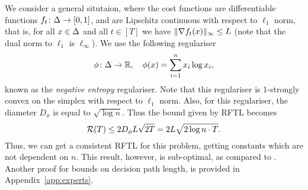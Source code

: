 We consider a general situtaion, where the cost functions are differentiable functions $f_t\colon \Delta \to [0,1]$, and are Lipschitz continuous with respect to $\ell_1$ norm, that is, for all $x\in\Delta$ and all $t\in[T]$ we have $\| \nabla f_t(x) \|_\infty \leq L$ (note that the dual norm to $\ell_1$ is  $\ell_\infty$). We use the following regulariser
\[
    \phi\colon \Delta\to\mathbb{R},\quad \phi(x) = \sum_{i=1}^n x_i\log x_i,
\]
known as the \emph{negative entropy} regulariser. Note that this regulariser is 1-strongly convex on the simplex with respect to $\ell_1$ norm. Also, for this regulariser, the diameter $D_\phi$ is equal to $\sqrt{\log n}$. Thus the bound given by RFTL becomes
\[
    \mathcal{R}(T) \leq 2D_\phi L \sqrt{2T} = 2L\sqrt{2\log n\cdot T}.
\]
Thus, we can get a consistent RFTL for this problem, getting constants which are not dependent on $n$. This result, however, is sub-optimal, as compared to \citet{altschuler2018online}.
Another proof for bounds on decision path length, is provided in Appendix~\ref{app:experts}.

